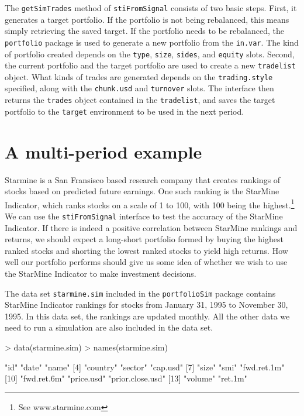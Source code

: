 \documentclass{article}
\begin{document}
The \texttt{getSimTrades} method of \texttt{stiFromSignal} consists of
two basic steps.  First, it generates a target portfolio.  If the
portfolio is not being rebalanced, this means simply retrieving the
saved target.  If the portfolio needs to be rebalanced, the
\texttt{portfolio} package is used to generate a new portfolio from
the \texttt{in.var}.  The kind of portfolio created depends on the
\texttt{type}, \texttt{size}, \texttt{sides}, and \texttt{equity}
slots.  Second, the current portfolio and the target portfolio are
used to create a new \texttt{tradelist} object.  What kinds of trades
are generated depends on the \texttt{trading.style} specified, along
with the \texttt{chunk.usd} and \texttt{turnover} slots.  The
interface then returns the \texttt{trades} object contained in the
\texttt{tradelist}, and saves the target portfolio to the
\texttt{target} environment to be used in the next period.


\section{A multi-period example}

Starmine is a San Fransisco based research company that creates
rankings of stocks based on predicted future earnings.  One such
ranking is the StarMine Indicator, which ranks stocks on a scale of 1
to 100, with 100 being the highest.\footnote{See www.starmine.com} We
can use the \texttt{stiFromSignal} interface to test the accuracy of
the StarMine Indicator.  If there is indeed a positive correlation
between StarMine rankings and returns, we should expect a long-short
portfolio formed by buying the highest ranked stocks and shorting the
lowest ranked stocks to yield high returns.  How well our portfolio
performs should give us some idea of whether we wish to use the
StarMine Indicator to make investment decisions.

The data set \texttt{starmine.sim} included in the
\texttt{portfolioSim} package contains StarMine Indicator rankings for
stocks from January 31, 1995 to November 30, 1995.  In this data set,
the rankings are updated monthly.  All the other data we need to run a
simulation are also included in the data set.

\begin{Schunk}
\begin{Sinput}
> data(starmine.sim)
> names(starmine.sim)
\end{Sinput}
\begin{Soutput}
 [1] "id"              "date"            "name"           
 [4] "country"         "sector"          "cap.usd"        
 [7] "size"            "smi"             "fwd.ret.1m"     
[10] "fwd.ret.6m"      "price.usd"       "prior.close.usd"
[13] "volume"          "ret.1m"         
\end{Soutput}
\end{Schunk}
\end{document}

